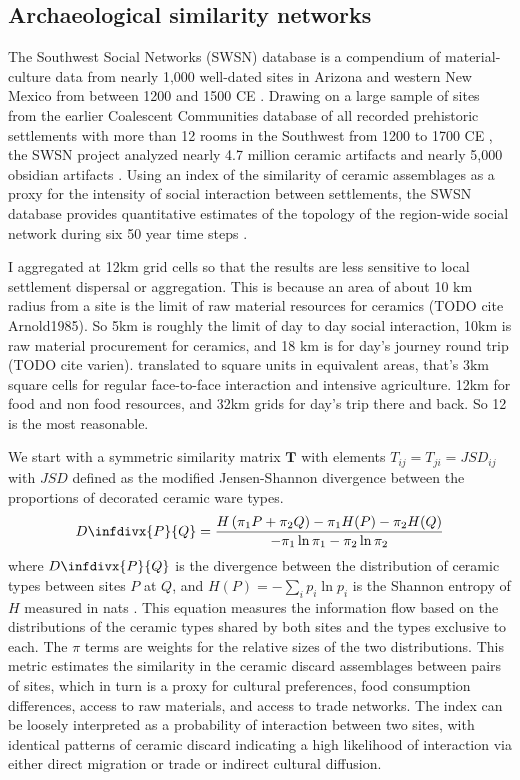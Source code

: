 \documentclass[11pt]{wlscirep}
\newcommand{\infdiv}{D\infdivx}
\begin{document}
\subsection*{Archaeological similarity networks}

The Southwest Social Networks (SWSN) database is a compendium of material-culture data from nearly 1,000 well-dated sites in Arizona and western New Mexico from between 1200 and 1500 CE \cite{Mills2012,Mills2013a,Peeples2013,Borck2015,Hill2015,Mills2015a}. Drawing on a large sample of sites from the earlier Coalescent Communities database of all recorded prehistoric settlements with more than 12 rooms in the Southwest from 1200 to 1700 CE \cite{Hill2004}, the SWSN project analyzed nearly 4.7 million ceramic artifacts and nearly 5,000 obsidian artifacts \cite{Mills2015a}. Using an index of the similarity of ceramic assemblages as a proxy for the intensity of social interaction between settlements, the SWSN database provides quantitative estimates of the topology of the region-wide social network during six 50 year time steps \cite{Mills2013a}.

I aggregated at 12km grid cells so that the results are less sensitive to local settlement dispersal or aggregation. This is because an area of about 10 km radius from a site is the limit of raw material resources for ceramics (TODO cite Arnold1985). So 5km is roughly the limit of day to day social interaction, 10km is raw material procurement for ceramics, and 18 km is for day's journey round trip (TODO cite varien). translated to square units in equivalent areas, that's 3km square cells for regular face-to-face interaction and intensive agriculture. 12km for food and non food resources, and 32km grids for day's trip there and back. So 12 is the most reasonable.

We start with a symmetric similarity matrix $\mathbf{T}$ with elements $T_{ij} = T_{ji} = JSD_{ij}$ with $JSD$ defined as the modified Jensen-Shannon divergence between the proportions of decorated ceramic ware types.
\begin{equation}
    \infdiv{P}{Q} = \frac{H\left(\pi_1P + \pi_2Q\right) - \pi_1H(P) - \pi_2H(Q)}{-\pi_1 \ln \pi_1 -\pi_2 \ln \pi_2}
\end{equation}
where $\infdiv{P}{Q}$ is the divergence between the distribution of ceramic types between sites $P$ at $Q$, and $H(P) = -\sum_i p_i \ln p_i$ is the Shannon entropy of $H$ measured in nats \cite{Masucci2011,PaoloMasucci2012}. This equation measures the information flow based on the distributions of the ceramic types shared by both sites and the types exclusive to each. The $\pi$ terms are weights for the relative sizes of the two distributions. This metric estimates the similarity in the ceramic discard assemblages between pairs of sites, which in turn is a proxy for cultural preferences, food consumption differences, access to raw materials, and access to trade networks. The index can be loosely interpreted as a probability of interaction between two sites, with identical patterns of ceramic discard indicating a high likelihood of interaction via either direct migration or trade or indirect cultural diffusion.
\end{document}
